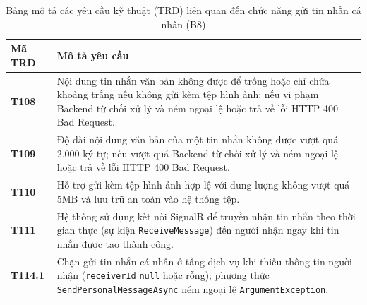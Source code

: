 \documentclass[11pt,a4paper]{article}
\begin{document}
\begin{table}[H]
\centering
\small
\begin{tabularx}{\textwidth}{|C{1.8cm}|X|}
\hline
{}
\textbf{Mã TRD} & \textbf{Mô tả yêu cầu} \tabularnewline
\hline
\textbf{T108} & Nội dung tin nhắn văn bản không được để trống hoặc chỉ chứa khoảng trắng nếu không gửi kèm tệp hình ảnh; nếu vi phạm Backend từ chối xử lý và ném ngoại lệ hoặc trả về lỗi HTTP 400 Bad Request. \\ \hline
\textbf{T109} & Độ dài nội dung văn bản của một tin nhắn không được vượt quá 2.000 ký tự; nếu vượt quá Backend từ chối xử lý và ném ngoại lệ hoặc trả về lỗi HTTP 400 Bad Request. \\ \hline
\textbf{T110} & Hỗ trợ gửi kèm tệp hình ảnh hợp lệ với dung lượng không vượt quá 5MB và lưu trữ an toàn vào hệ thống tệp. \\ \hline
\textbf{T111} & Hệ thống sử dụng kết nối SignalR để truyền nhận tin nhắn theo thời gian thực (sự kiện \texttt{ReceiveMessage}) đến người nhận ngay khi tin nhắn được tạo thành công. \\ \hline
\textbf{T114.1} & Chặn gửi tin nhắn cá nhân ở tầng dịch vụ khi thiếu thông tin người nhận (\texttt{receiverId} \texttt{null} hoặc rỗng); phương thức \texttt{SendPersonalMessageAsync} ném ngoại lệ \texttt{ArgumentException}. \\ \hline
\end{tabularx}
\caption{Bảng mô tả các yêu cầu kỹ thuật (TRD) liên quan đến chức năng gửi tin nhắn cá nhân (B8)}
\end{table}
\end{document}
